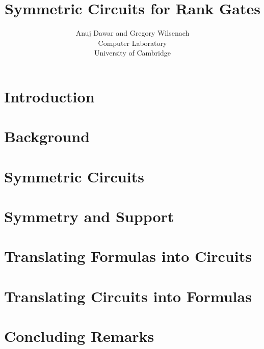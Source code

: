 \documentclass[12pt]{article}
\begin{document}
\title{Symmetric Circuits for Rank Gates}

\author{Anuj Dawar and Gregory Wilsenach \\ 
Computer Laboratory \\
University of Cambridge}

\maketitle

\tableofcontents
\newpage

\section{Introduction}

\newpage

\section{Background}

\newpage

\section{Symmetric Circuits}

\newpage

\section{Symmetry and Support}

\newpage

\section{Translating Formulas into Circuits}

\newpage

\section{Translating Circuits into Formulas}

\newpage

\section{Concluding Remarks}

\newpage
 
\end{document}

